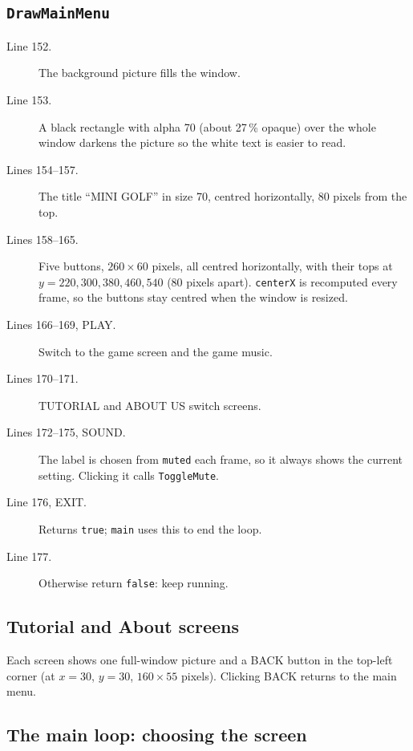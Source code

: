 \documentclass[11pt,a4paper]{article}
\newcommand{\code}[3]{}
\begin{document}
\subsection{\texttt{DrawMainMenu}}

\code{main.c}{150}{178}

\begin{description}
  \item[Line 152.] The background picture fills the window.
  \item[Line 153.] A black rectangle with alpha 70 (about 27\,\% opaque) over the whole window darkens the picture so
  the white text is easier to read.
  \item[Lines 154--157.] The title ``MINI GOLF'' in size 70, centred horizontally, 80 pixels from the top.
  \item[Lines 158--165.] Five buttons, $260\times60$ pixels, all centred horizontally, with their tops at
  $y = 220, 300, 380, 460, 540$ (80 pixels apart). \texttt{centerX} is recomputed every frame, so the buttons stay
  centred when the window is resized.
  \item[Lines 166--169, PLAY.] Switch to the game screen and the game music.
  \item[Lines 170--171.] TUTORIAL and ABOUT US switch screens.
  \item[Lines 172--175, SOUND.] The label is chosen from \texttt{muted} each frame, so it always shows the current
  setting. Clicking it calls \texttt{ToggleMute}.
  \item[Line 176, EXIT.] Returns \texttt{true}; \texttt{main} uses this to end the loop.
  \item[Line 177.] Otherwise return \texttt{false}: keep running.
\end{description}

\subsection{Tutorial and About screens}

\code{main.c}{181}{194}

Each screen shows one full-window picture and a BACK button in the top-left corner (at $x=30$, $y=30$,
$160\times55$ pixels). Clicking BACK returns to the main menu.

\subsection{The main loop: choosing the screen}
\end{document}
